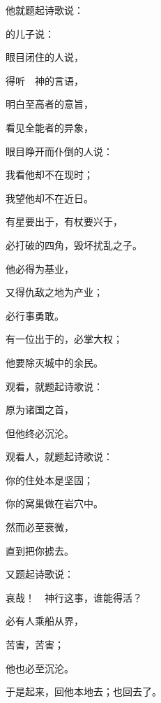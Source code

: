 {他就题起诗歌说：
\par }{的儿子{}说：
\par }{\Q 眼目闭住的人说，
\par }{\Q {}得听　神的言语，
\par }{\Q 明白至高者的意旨，
\par }{\Q 看见全能者的异象，
\par }{\Q 眼目睁开而仆倒的人说：
\par }{\Q {}我看他却不在现时；
\par }{\Q 我望他却不在近日。
\par }{\Q 有星要出于{}，有杖要兴于{}，
\par }{\Q 必打破{}的四角，毁坏扰乱之子。
\par }{\Q {}他必得{}为基业，
\par }{\Q 又得仇敌之地{}为产业；
\par }{必行事勇敢。
\par }{\Q {}有一位出于{}的，必掌大权；
\par }{\Q 他要除灭城中的余民。
\par }{\Q {}观看{}，就题起诗歌说：
\par }{原为诸国之首，
\par }{\Q 但他终必沉沦。
\par }{\Q {}观看{}人，就题起诗歌说：
\par }{\Q 你的住处本是坚固；
\par }{\Q 你的窝巢做在岩穴中。
\par }{\Q {}然而{}必至衰微，
\par }{\Q 直到{}把你掳去。
\par }{\Q {}又题起诗歌说：
\par }{\Q 哀哉！　神行这事，谁能得活？
\par }{\Q {}必有人乘船从{}界{}，
\par }{\Q 苦害{}，苦害{}；
\par }{\Q 他也必至沉沦。
\par }{\Q {}于是{}起来，回他本地去；{}也回去了。

}
